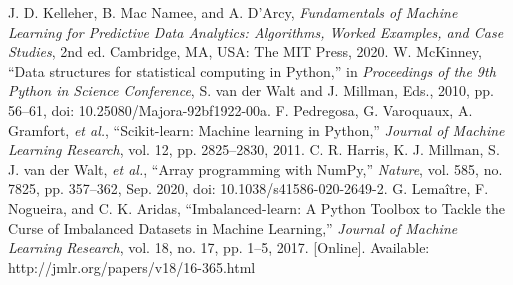 \documentclass[conference]{IEEEtran}
\begin{document}
\begin{thebibliography}{00}
	 J. D. Kelleher, B. Mac Namee, and A. D’Arcy, \textit{Fundamentals of Machine Learning for Predictive Data Analytics: Algorithms, Worked Examples, and Case Studies}, 2nd ed. Cambridge, MA, USA: The MIT Press, 2020.
	 W. McKinney, ``Data structures for statistical computing in Python,'' in \textit{Proceedings of the 9th Python in Science Conference}, S. van der Walt and J. Millman, Eds., 2010, pp. 56--61, doi: 10.25080/Majora-92bf1922-00a.
	 F. Pedregosa, G. Varoquaux, A. Gramfort, \textit{et al.}, ``Scikit-learn: Machine learning in Python,'' \textit{Journal of Machine Learning Research}, vol. 12, pp. 2825--2830, 2011.
	 C. R. Harris, K. J. Millman, S. J. van der Walt, \textit{et al.}, ``Array programming with NumPy,'' \textit{Nature}, vol. 585, no. 7825, pp. 357--362, Sep. 2020, doi: 10.1038/s41586-020-2649-2.
	 G. Lemaître, F. Nogueira, and C. K. Aridas, ``Imbalanced-learn: A Python Toolbox to Tackle the Curse of Imbalanced Datasets in Machine Learning,'' \textit{Journal of Machine Learning Research}, vol. 18, no. 17, pp. 1--5, 2017. [Online]. Available: http://jmlr.org/papers/v18/16-365.html
\end{thebibliography}


	
\end{document}
